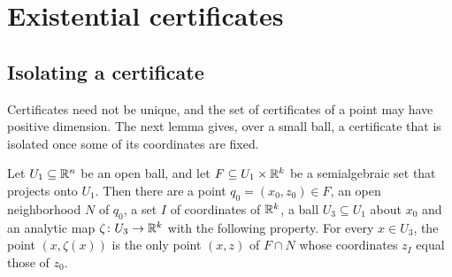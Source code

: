 \section{Existential certificates}\label{sec:certificates}

\subsection{Isolating a certificate}

Certificates need not be unique, and the set of certificates of a point may have positive dimension. The next lemma gives, over a small ball, a certificate that is isolated once some of its coordinates are fixed.

\begin{lemma}\label{lem:isolate}
Let $U_1\subseteq\mathbb{R}^n$ be an open ball, and let $F\subseteq U_1\times\mathbb{R}^k$ be a semialgebraic set that projects onto $U_1$. Then there are a point $q_0=(x_0,z_0)\in F$, an open neighborhood $N$ of $q_0$, a set $I$ of coordinates of $\mathbb{R}^k$, a ball $U_3\subseteq U_1$ about $x_0$ and an analytic map $\zeta\colon U_3\to\mathbb{R}^k$ with the following property. For every $x\in U_3$, the point $(x,\zeta(x))$ is the only point $(x,z)$ of $F\cap N$ whose coordinates $z_I$ equal those of $z_0$.
\end{lemma}

